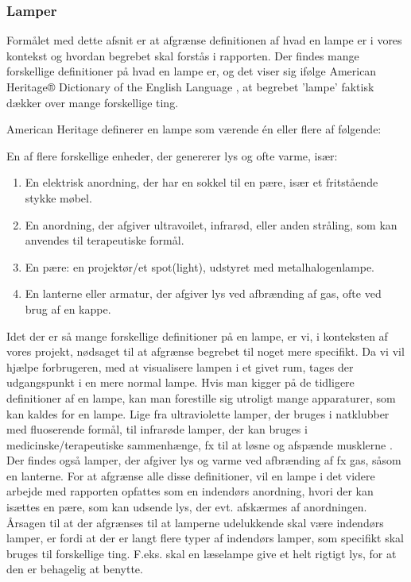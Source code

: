 \subsubsection{Lamper}
Formålet med dette afsnit er at afgrænse definitionen af hvad en lampe er i vores kontekst og hvordan begrebet skal forstås i rapporten.
Der findes mange forskellige definitioner på hvad en lampe er, og det viser sig ifølge American Heritage® Dictionary of the English Language \cite{american_heritage}, at begrebet ’lampe’ faktisk dækker over mange forskellige ting. 

American Heritage definerer en lampe som værende én eller flere af følgende:

En af flere forskellige enheder, der genererer lys og ofte varme, især:
\begin{enumerate}
    \item En elektrisk anordning, der har en sokkel til en pære, især et fritstående stykke møbel.
    \item En anordning, der afgiver ultravoilet, infrarød, eller anden stråling, som kan anvendes til terapeutiske formål.
    \item En pære: en projektør/et spot(light), udstyret med metalhalogenlampe.
    \item En lanterne eller armatur, der afgiver lys ved afbrænding af gas, ofte ved brug af en kappe.
\end{enumerate}

Idet der er så mange forskellige definitioner på en lampe, er vi, i konteksten af vores projekt, nødsaget til at afgrænse begrebet til noget mere specifikt. Da vi vil hjælpe forbrugeren, med at visualisere lampen i et givet rum, tages der udgangspunkt i en mere normal lampe. Hvis man kigger på de tidligere definitioner af en lampe, kan man forestille sig utroligt mange apparaturer, som kan kaldes for en lampe. Lige fra ultraviolette lamper, der bruges i natklubber med fluoserende formål, til infrarøde lamper, der kan bruges i medicinske/terapeutiske sammenhænge, fx til at løsne og afspænde musklerne \cite{lys_terapi}. Der findes også lamper, der afgiver lys og varme ved afbrænding af fx gas, såsom en lanterne. For at afgrænse alle disse definitioner, vil en lampe i det videre arbejde med rapporten opfattes som en indendørs anordning, hvori der kan isættes en pære, som kan udsende lys, der evt. afskærmes af anordningen. Årsagen til at der afgrænses til at lamperne udelukkende skal være indendørs lamper, er fordi at der er langt flere typer af indendørs lamper, som specifikt skal bruges til forskellige ting. F.eks. skal en læselampe give et helt rigtigt lys, for at den er behagelig at benytte.


